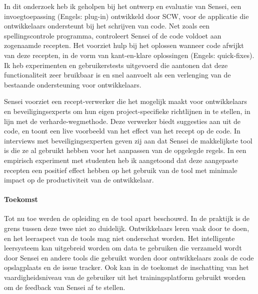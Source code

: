 In dit onderzoek heb ik geholpen bij het ontwerp en evaluatie van Sensei, een invoegtoepassing (Engels: plug-in) ontwikkeld door SCW, voor de applicatie die ontwikkelaars ondersteunt bij het schrijven van code.
Net zoals een spellingscontrole programma, controleert Sensei of de code voldoet aan zogenaamde recepten.
Het voorziet hulp bij het oplossen wanneer code afwijkt van deze recepten, in de vorm van kant-en-klare oplossingen (Engels: quick-fixes).
Ik heb experimenten en gebruikerstests uitgevoerd die aantonen dat deze functionaliteit zeer bruikbaar is en snel aanvoelt als een verlenging van de bestaande ondersteuning voor ontwikkelaars.

Sensei voorziet een recept-verwerker die het mogelijk maakt voor ontwikkelaars en beveiligingsexperts om hun eigen project-specifieke richtlijnen in te stellen, in lijn met de verharde-wegmethode.
Deze verwerker biedt suggesties aan uit de code, en toont een live voorbeeld van het effect van het recept op de code.
In interviews met beveiligingsexperten geven zij aan dat Sensei de makkelijkste tool is die ze al gebruikt hebben voor het aanpassen van de opgelegde regels.
In een empirisch experiment met studenten heb ik aangetoond dat deze aangepaste recepten een positief effect hebben op het gebruik van de tool met minimale impact op de productiviteit van de ontwikkelaar.

\paragraph{Toekomst}
Tot nu toe werden de opleiding en de tool apart beschouwd.
In de praktijk is de grens tussen deze twee niet zo duidelijk.
Ontwikkelaars leren vaak door te doen, en het leeraspect van de tools mag niet onderschat worden.
Het intelligente leersysteem kan uitgebreid worden om data te gebruiken die verzameld wordt door Sensei en andere tools die gebruikt worden door ontwikkelaars zoals de code opslagplaats en de issue tracker.
Ook kan in de toekomst de inschatting van het vaardigheidsniveau van de gebruiker uit het trainingsplatform gebruikt worden om de feedback van Sensei af te stellen.
